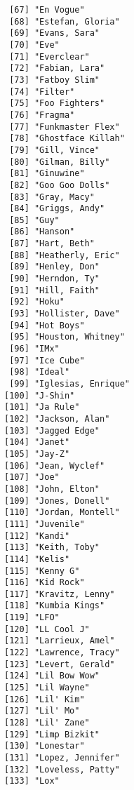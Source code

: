\documentclass[
  letterpaper,
  DIV=11,
  numbers=noendperiod]{scrreprt}
\begin{document}
\begin{itemize}
\begin{verbatim}
 [67] "En Vogue"                      
 [68] "Estefan, Gloria"               
 [69] "Evans, Sara"                   
 [70] "Eve"                           
 [71] "Everclear"                     
 [72] "Fabian, Lara"                  
 [73] "Fatboy Slim"                   
 [74] "Filter"                        
 [75] "Foo Fighters"                  
 [76] "Fragma"                        
 [77] "Funkmaster Flex"               
 [78] "Ghostface Killah"              
 [79] "Gill, Vince"                   
 [80] "Gilman, Billy"                 
 [81] "Ginuwine"                      
 [82] "Goo Goo Dolls"                 
 [83] "Gray, Macy"                    
 [84] "Griggs, Andy"                  
 [85] "Guy"                           
 [86] "Hanson"                        
 [87] "Hart, Beth"                    
 [88] "Heatherly, Eric"               
 [89] "Henley, Don"                   
 [90] "Herndon, Ty"                   
 [91] "Hill, Faith"                   
 [92] "Hoku"                          
 [93] "Hollister, Dave"               
 [94] "Hot Boys"                      
 [95] "Houston, Whitney"              
 [96] "IMx"                           
 [97] "Ice Cube"                      
 [98] "Ideal"                         
 [99] "Iglesias, Enrique"             
[100] "J-Shin"                        
[101] "Ja Rule"                       
[102] "Jackson, Alan"                 
[103] "Jagged Edge"                   
[104] "Janet"                         
[105] "Jay-Z"                         
[106] "Jean, Wyclef"                  
[107] "Joe"                           
[108] "John, Elton"                   
[109] "Jones, Donell"                 
[110] "Jordan, Montell"               
[111] "Juvenile"                      
[112] "Kandi"                         
[113] "Keith, Toby"                   
[114] "Kelis"                         
[115] "Kenny G"                       
[116] "Kid Rock"                      
[117] "Kravitz, Lenny"                
[118] "Kumbia Kings"                  
[119] "LFO"                           
[120] "LL Cool J"                     
[121] "Larrieux, Amel"                
[122] "Lawrence, Tracy"               
[123] "Levert, Gerald"                
[124] "Lil Bow Wow"                   
[125] "Lil Wayne"                     
[126] "Lil' Kim"                      
[127] "Lil' Mo"                       
[128] "Lil' Zane"                     
[129] "Limp Bizkit"                   
[130] "Lonestar"                      
[131] "Lopez, Jennifer"               
[132] "Loveless, Patty"               
[133] "Lox"                           

\end{verbatim}
\end{itemize}
\end{document}
